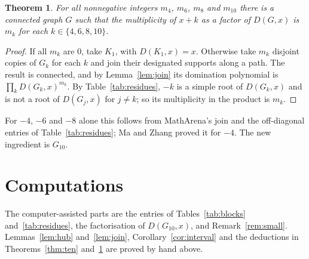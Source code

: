 \documentclass[11pt]{amsart}
\newtheorem{theorem}{Theorem}
\theoremstyle{remark}
\begin{document}
\begin{theorem}\label{thm:mult}
For all nonnegative integers $m_4$, $m_6$, $m_8$ and $m_{10}$ there is a
connected graph $G$ such that the multiplicity of $x+k$ as a factor of
$D(G,x)$ is $m_k$ for each $k\in\{4,6,8,10\}$.
\end{theorem}

\begin{proof}
If all $m_k$ are $0$, take $K_1$, with $D(K_1,x)=x$. Otherwise take $m_k$
disjoint copies of $G_k$ for each $k$ and join their designated supports along
a path. The result is connected, and by Lemma~\ref{lem:join} its domination
polynomial is $\prod_k D(G_k,x)^{m_k}$. By Table~\ref{tab:residues},
$-k$ is a simple root of $D(G_k,x)$ and is not a root of $D(G_j,x)$ for
$j\ne k$; so its multiplicity in the product is $m_k$.
\end{proof}

For $-4$, $-6$ and $-8$ alone this follows from MathArena's join \cite{MA26} and
the off-diagonal entries of Table~\ref{tab:residues}; Ma and Zhang \cite{MZ26}
proved it for $-4$. The new ingredient is $G_{10}$.

\section{Computations}\label{sec:certificates}

The computer-assisted parts are the entries of Tables~\ref{tab:blocks}
and~\ref{tab:residues}, the factorisation of $D(G_{10},x)$, and
Remark~\ref{rem:small}. Lemmas~\ref{lem:hub} and~\ref{lem:join},
Corollary~\ref{cor:interval} and the deductions in Theorems~\ref{thm:ten}
and~\ref{thm:mult} are proved by hand above.
\end{document}
